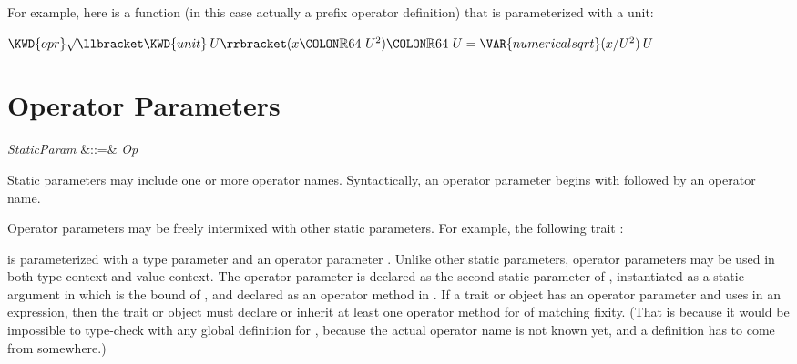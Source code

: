For example, here is a function (in this case actually a prefix operator definition) that is parameterized with a unit:
\begin{Fortress}
\(\KWD{opr} \mathord{\surd}\llbracket\KWD{unit}\:U\rrbracket(x\COLON \mathbb{R}64\ U^{2})\COLON \mathbb{R}64\ U = \VAR{numericalsqrt}(x/U^{2})\:U\)
\end{Fortress}


\section{Operator Parameters}
\begin{Grammar}
\emph{StaticParam} &::=&  \emph{Op} \\
\end{Grammar}

Static parameters may include one or more operator names.
Syntactically, an operator parameter begins with
 followed by an operator name.


Operator parameters may be freely intermixed with other
static parameters.  For example, the following trait :

is parameterized with a type parameter  and
an operator parameter \EXP{\odot}.
Unlike other static parameters,
operator parameters may be used in both type context and
value context.  The operator parameter \EXP{\odot}
is declared as the second static parameter of ,
instantiated as a static argument in
which is the bound of ,
and declared as an operator method in .
If a trait or object has an operator parameter  and uses 
in an expression, then the trait or object must declare or inherit
at least one operator method for  of matching fixity.
(That is because it would be impossible to type-check 
with any global definition for ,
because the actual operator name is not known
yet, and a definition has to come from somewhere.)


